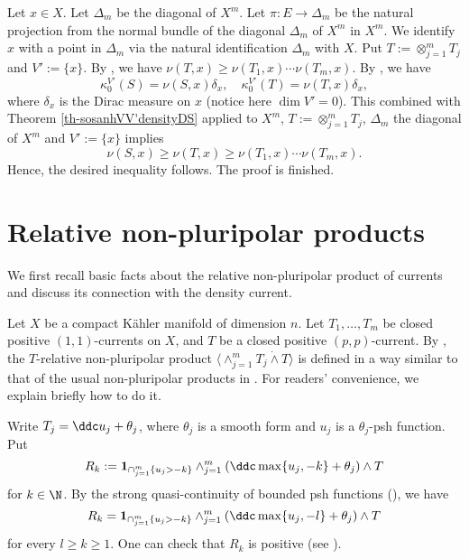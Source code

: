     \proof  
        Let $x \in X$. Let $\Delta_m$ be the diagonal of $X^m$. Let $\pi: E \to \Delta_m$ be the natural projection from the normal bundle of the diagonal $\Delta_m$ of $X^m$ in $X^m$. We identify $x$ with a point in $\Delta_m$ via the natural identification $\Delta_m$ with $X$.  Put $T:= \otimes_{j=1}^m T_j$ and $V':=\{x\}$. By \cite[Lemma 2.4]{Meo-auto-inter}, we have $\nu(T,x) \ge \nu(T_1,x) \cdots \nu(T_m,x)$. By \cite[Proposition 5.6]{Dinh_Sibony_density}, we have $$\kappa^{V'}_0(S)= \nu(S,x) \delta_{x}, \quad \kappa^{V'}_0(T)= \nu(T,x) \delta_x,$$ where $\delta_{x}$ is the Dirac measure on $x$ (notice here $\dim V' =0$). This combined with Theorem \ref{th-sosanhVV'densityDS} applied to $X^m$, $T:= \otimes_{j=1}^m T_j$, $\Delta_m$ the diagonal of $X^m$ and $V':=\{x\}$  implies $$\nu(S,x)  \ge \nu(T,x) \ge \nu(T_1,x) \cdots \nu(T_m,x).$$ Hence, the desired inequality follows. The proof is finished.  
    \endproof





\section{Relative non-pluripolar products} \label{sec-nonpluripolar}



     We first recall basic facts about the relative non-pluripolar product of currents and discuss its connection with the density current.
 
    Let $X$ be  a compact K\"ahler manifold of dimension $n$. Let $T_1, \ldots, T_m$ be closed positive $(1,1)$-currents on $X$, and $T$ be a closed positive $(p,p)$-current. By \cite{Viet-generalized-nonpluri}, the $T$-relative non-pluripolar product $\langle \wedge_{j=1}^m T_j \dot{\wedge} T\rangle$ is defined  in a way similar to that of  the usual non-pluripolar products  in \cite{BT_fine_87, BEGZ}. For readers' convenience, we explain briefly how to do it. 

    Write $T_j= \ddc u_j+ \theta_j$, where $\theta_j$ is a smooth form and $u_j$ is a $\theta_j$-psh function. Put 
    $$R_k:=\bold{1}_{\cap_{j=1}^m \{u_j >-k\}} \wedge_{j=1}^m (\ddc \max\{u_j,-k\} + \theta_j)\wedge T$$
    for $k \in \N$. By the strong quasi-continuity of bounded psh functions (\cite[Theorems 2.4 and 2.9]{Viet-generalized-nonpluri}), we have 
    $$R_k= \bold{1}_{\cap_{j=1}^m \{u_j >-k\}} \wedge_{j=1}^m (\ddc \max\{u_j,-l\} + \theta_j)\wedge T$$
    for every $l \ge k \ge 1$. One can check that  $R_k$ is positive (see \cite[Lemma 3.2]{Viet-generalized-nonpluri}). 

